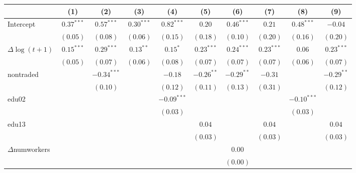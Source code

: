 
\begin{tabular}{l c c c c c c c c c }
\hline
 & (1) & (2) & (3) & (4) & (5) & (6) & (7) & (8) & (9) \\
\hline
Intercept          & $0.37^{***}$ & $0.57^{***}$  & $0.30^{***}$ & $0.82^{***}$  & $0.20$       & $0.46^{***}$ & $0.21$       & $0.48^{***}$  & $-0.04$      \\
                     & $(0.05)$     & $(0.08)$      & $(0.06)$     & $(0.15)$      & $(0.18)$     & $(0.10)$     & $(0.20)$     & $(0.16)$      & $(0.20)$     \\
$\Delta\log(t+1)$    & $0.15^{***}$ & $0.29^{***}$  & $0.13^{**}$  & $0.15^{*}$    & $0.23^{***}$ & $0.24^{***}$ & $0.23^{***}$ & $0.06$        & $0.23^{***}$ \\
                     & $(0.05)$     & $(0.07)$      & $(0.06)$     & $(0.08)$      & $(0.07)$     & $(0.07)$     & $(0.07)$     & $(0.06)$      & $(0.07)$     \\
nontraded            &              & $-0.34^{***}$ &              & $-0.18$       & $-0.26^{**}$ & $-0.29^{**}$ & $-0.31$      &               & $-0.29^{**}$ \\
                     &              & $(0.10)$      &              & $(0.12)$      & $(0.11)$     & $(0.13)$     & $(0.31)$     &               & $(0.12)$     \\
edu02                &              &               &              & $-0.09^{***}$ &              &              &              & $-0.10^{***}$ &              \\
                     &              &               &              & $(0.03)$      &              &              &              & $(0.03)$      &              \\
edu13                &              &               &              &               & $0.04$       &              & $0.04$       &               & $0.04$       \\
                     &              &               &              &               & $(0.03)$     &              & $(0.03)$     &               & $(0.03)$     \\
$\Delta$numworkers   &              &               &              &               &              & $0.00$       &              &               &              \\
                     &              &               &              &               &              & $(0.00)$     &              &               &              \\

\end{tabular}
